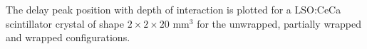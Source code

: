 \label{fig:centroidposition-20} The delay peak position with depth of interaction is plotted for a LSO:CeCa scintillator crystal of shape $2\times2\times20$ mm$^3$ for the unwrapped, partially wrapped and wrapped configurations.